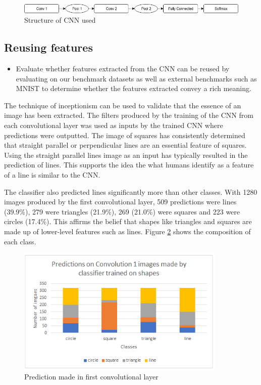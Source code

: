 \begin{figure}[H]
	\begin{center}
		\includegraphics[width=150mm, scale=0.9]{CNN_structure.png}
		\caption{Structure of CNN used}
		\label{fig:cnnStructure}
	\end{center}
	
\end{figure}

\subsection{Reusing features} \label{subsec:reuse}
\begin{itemize}
		\item Evaluate whether features extracted from the CNN can be reused by evaluating on our benchmark datasets as well as external benchmarks such as MNIST to determine whether the features extracted convey a rich meaning.
	
\end{itemize}

The technique of inceptionism can be used to validate that the essence of an image has been extracted. The filters produced by the training of the CNN from each convolutional layer was used as inputs by the trained CNN where predictions were outputted. The image of squares has consistently determined that straight parallel or perpendicular lines are an essential feature of squares. Using the straight parallel lines image as an input has typically resulted in the prediction of lines. This supports the idea the what humans identify as a feature of a line is similar to the CNN.  

The classifier also predicted lines significantly more than other classes. With 1280 images produced by the first convolutional layer, 509 predictions were lines (39.9\%), 279 were triangles (21.9\%), 269 (21.0\%) were squares and 223 were circles (17.4\%). This affirms the belief that shapes like triangles and squares are made up of lower-level features such as lines. Figure \ref{fig:graph_conv1} shows the composition of each class. 
\begin{figure}
	\begin{center}
		\includegraphics[width=100mm, scale=1]{graph_conv1.png}
		\caption{Prediction made in first convolutional layer}
		\label{fig:graph_conv1}
	\end{center}
	
\end{figure}

